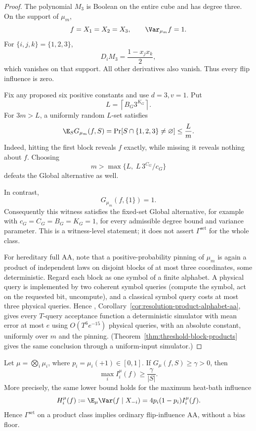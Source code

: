 \begin{proof}
The polynomial \(M_3\) is Boolean on the entire cube and has degree
three. On the support of \(\mu_m\),
\[
 f=X_1=X_2=X_3,\qquad \Var_{\mu_m}f=1.
\]
For \(\{i,j,k\}=\{1,2,3\}\),
\[
 D_iM_3=\frac{1-x_jx_k}{2},
\]
which vanishes on that support. All other derivatives also vanish.
Thus every flip influence is zero.

Fix any proposed six positive constants and use \(d=3,v=1\). Put
\[
 L=\left\lceil B_G3^{K_G}\right\rceil.
\]
For \(3m>L\), a uniformly random \(L\)-set satisfies
\[
 \E_S G_{\mu_m}(f,S)
 =\Pr[S\cap\{1,2,3\}\ne\varnothing]
 \le \frac{L}{m}.
\]
Indeed, hitting the first block reveals \(f\) exactly, while missing it
reveals nothing about \(f\). Choosing
\[
 m>\max\{L,\;L\,3^{C_G}/c_G\}
\]
defeats the Global alternative as well.

In contrast,
\[
 G_{\mu_m}(f,\{1\})=1.
\]
Consequently this witness satisfies the fixed-set Global alternative,
for example with
\(c_G=C_G=B_G=K_G=1\), for every admissible degree bound and variance
parameter. This is a witness-level statement; it does not assert
\(\Gamma^{\mathrm{set}}\) for the whole class.

For hereditary full AA, note that a positive-probability pinning of
\(\mu_m\) is again a product of independent laws on disjoint blocks of
at most three coordinates, some deterministic. Regard each block as one
symbol of a finite alphabet. A physical query is implemented by two
coherent symbol queries (compute the symbol, act on the requested bit,
uncompute), and a classical symbol query costs at most three physical
queries. Hence ,
Corollary~\ref{cor:resolution-product-alphabet-aa}, gives every
\(T\)-query acceptance function a deterministic simulator with mean
error at most \(e\) using \(O(T^6e^{-15})\) physical queries, with an
absolute constant, uniformly over \(m\) and the pinning.
(Theorem~\ref{thm:threshold-block-products} gives the same conclusion
through a uniform-input simulator.)
\end{proof}

\begin{proposition}
\label{ian:product-global-to-local}
Let \(\mu=\bigotimes_i\mu_i\), where
\(p_i=\mu_i(+1)\in[0,1]\). If \(G_\mu(f,S)\ge\gamma>0\), then
\[
 \max_i I_i^\mu(f)\ge\frac{\gamma}{|S|}.
\]
More precisely, the same lower bound holds for the maximum
heat-bath influence
\[
 H_i^\mu(f):=\E_\mu\Var(f\mid X_{-i})
            =4p_i(1-p_i)I_i^\mu(f).
\]
Hence \(\Gamma^{\mathrm{set}}\) on a product class implies ordinary
flip-influence AA, without a bias floor.
\end{proposition}

